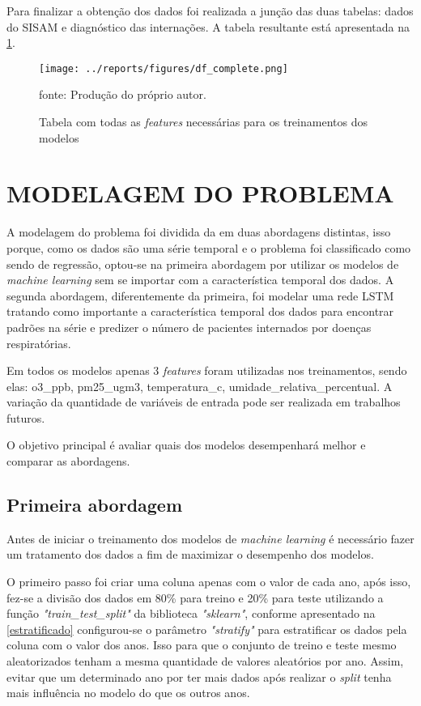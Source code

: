 \documentclass[
  12pt,		%
  a4paper,	%
  openright,%
  oneside,	%
  chapter=TITLE,		%
  section=TITLE,		%
  english,	%
  french,	%
  spanish,	%
  brazil	%
]{abntex2}
\begin{document}
    Para finalizar a obtenção dos dados foi realizada a junção das duas tabelas: dados do SISAM e diagnóstico das internações. 
    A tabela resultante está apresentada na \ref*{tabela_completa}.

    \begin{figure}[ht]
        \centering
        \caption{Tabela com todas as \textit{features} necessárias para os treinamentos dos modelos}
        \texttt{[image: ../reports/figures/df\_complete.png]}
        \label{tabela_completa}
        \par
        {\small fonte: Produção do próprio autor.}
    \end{figure}

    \section{MODELAGEM DO PROBLEMA}

    A modelagem do problema foi dividida da em duas abordagens distintas, isso porque, como os dados 
    são uma série temporal e o problema foi classificado como sendo de regressão, optou-se na primeira abordagem por
    utilizar os modelos de \textit{machine learning} sem se importar com a característica temporal dos dados. A segunda
    abordagem, diferentemente da primeira, foi modelar uma rede LSTM tratando como importante a característica temporal
    dos dados para encontrar padrões na série e predizer o número de pacientes internados por doenças respiratórias.

    Em todos os modelos apenas 3 \textit{features} foram utilizadas nos treinamentos, sendo elas:
    o3\_ppb, pm25\_ugm3, temperatura\_c, umidade\_relativa\_percentual. A variação da quantidade de variáveis
    de entrada pode ser realizada em trabalhos futuros.

    O objetivo principal é avaliar quais dos modelos desempenhará melhor e comparar as abordagens.

    \subsection{Primeira abordagem}
    Antes de iniciar o treinamento dos modelos de \textit{machine learning} é necessário fazer um tratamento dos
    dados a fim de maximizar o desempenho dos modelos.

    O primeiro passo foi criar uma coluna apenas com o valor de cada ano, após isso, fez-se a divisão
    dos dados em 80\% para treino e 20\% para teste utilizando a função \textit{"train\_test\_split"} da biblioteca
    \textit{"sklearn"}, conforme apresentado na \ref*{estratificado} configurou-se o parâmetro \textit{"stratify"} para estratificar os dados
    pela coluna com o valor dos anos. Isso para que o conjunto de treino e teste mesmo aleatorizados tenham a mesma
    quantidade de valores aleatórios por ano. Assim, evitar que um determinado ano por ter mais dados após realizar o \textit{split}
    tenha mais influência no modelo do que os outros anos.
\end{document}
